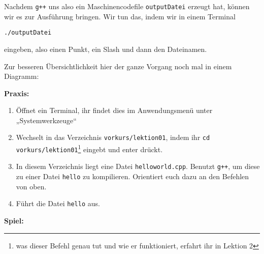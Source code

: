 Nachdem \texttt{g++} uns also ein Maschinencodefile \texttt{outputDatei}
erzeugt hat, können wir es zur Ausführung bringen. Wir tun das, indem wir in
einem Terminal
\begin{center}
	\texttt{./outputDatei}
\end{center}
eingeben, also einen Punkt, ein Slash und dann den Dateinamen.

Zur besseren Übersichtlichkeit hier der ganze Vorgang noch mal in einem
Diagramm:

\begin{center}
\end{center}

\textbf{Praxis:}
\begin{enumerate}
	\item Öffnet ein Terminal, ihr findet dies im Anwendungsmenü unter
		„Systemwerkzeuge“
    \item Wechselt in das Verzeichnis \texttt{vorkurs/lektion01}, indem ihr
		\texttt{cd vorkurs/lektion01}\footnote{was dieser Befehl genau tut und wie er funktioniert, erfahrt ihr in Lektion 2} eingebt und enter drückt.
    \item In diesem Verzeichnis liegt eine Datei \texttt{helloworld.cpp}.
        Benutzt \texttt{g++}, um diese zu einer Datei \texttt{hello} zu
        kompilieren. Orientiert euch dazu an den Befehlen von oben.
    \item Führt die Datei \texttt{hello} aus.
\end{enumerate}


\textbf{Spiel:}

